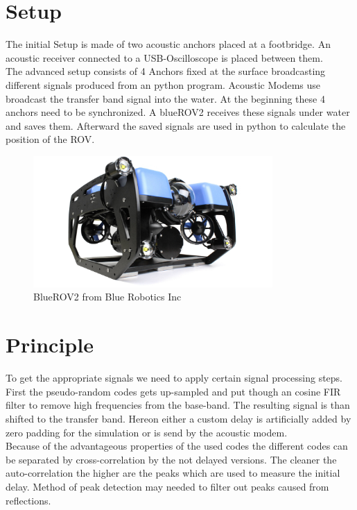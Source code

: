 \section{Setup}
The initial Setup is made of two acoustic anchors placed at a footbridge. An acoustic receiver connected to a  USB-Oscilloscope is placed between them. \\
The advanced setup consists of 4 Anchors fixed at the surface broadcasting different signals produced from an python program. Acoustic Modems use broadcast the transfer band signal into the water. At the beginning these 4 anchors need to be synchronized. A blueROV2 receives these signals under water and saves them. Afterward the saved signals are used in python to calculate the position of the ROV.
\begin{figure}[h]
	\includegraphics[height=5cm]{images/bluerov}
	
	\caption{BlueROV2 from Blue Robotics Inc}
	\label{fig:bode}
\end{figure}

\section{Principle}

To get the appropriate signals we need to apply certain signal processing steps. First the pseudo-random codes gets up-sampled and put though an cosine FIR filter to remove high frequencies from the base-band. The resulting signal is than shifted to the transfer band. Hereon either a custom delay is artificially added by zero padding for the simulation or is send by the acoustic modem. \\
Because of the advantageous properties of the used codes the different codes can be separated by cross-correlation by the not delayed versions. The cleaner the auto-correlation the higher are the peaks which are used to measure the initial delay. Method of peak detection may needed to filter out peaks caused from reflections.\\
